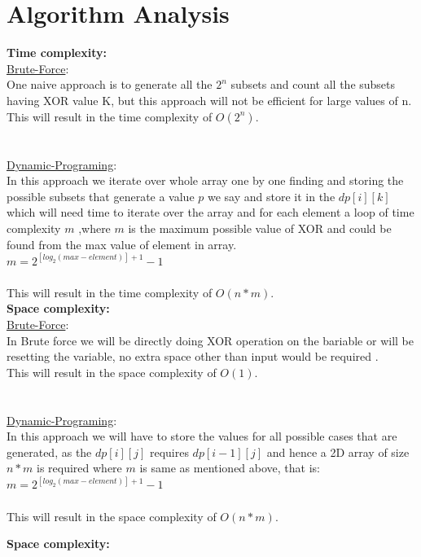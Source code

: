 \documentclass[conference]{IEEEtran}
\begin{document}
\section{Algorithm Analysis}
\textbf{Time complexity:}\\
\underline{Brute-Force}:\\
One naive approach is to generate all the $2^{n}$ subsets and count all the subsets having XOR value K, but this approach will not be efficient for large values of n.\\
This will result in the time complexity of $O(2^{n})$. 
\\\\\\
\underline{Dynamic-Programing}:\\
In this  approach we iterate over whole array one by one finding and storing the possible subsets that generate a value $p$ we say and store it in the $dp[i][k]$ which will need time to iterate over the array and for each element a loop of time complexity $m$ ,where $m$ is the maximum possible value of XOR and could be found from the max value of element in array.\\

\quad $m=2^{[log_2(max-element)] + 1}-1$\\\\
This will result in the time complexity of $O(n*m)$. 
\\
\textbf{Space complexity:}\\
\underline{Brute-Force}:\\
In Brute force we will be directly doing XOR operation on the bariable or will be resetting the variable, no extra space other than input would be required .\\
This will result in the space complexity of $O(1)$. 
\\\\\\
\underline{Dynamic-Programing}:\\
In this  approach we will have to store the values for all possible cases that are generated, as the $dp[i][j]$ requires $dp[i-1][j]$ and hence a 2D array of size $n*m$ is required where $m$ is same as mentioned above, that is:\\

\quad $m=2^{[log_2(max-element)] + 1}-1$\\\\
This will result in the space complexity of $O(n*m)$. 

\textbf{Space complexity:}
\end{document}
